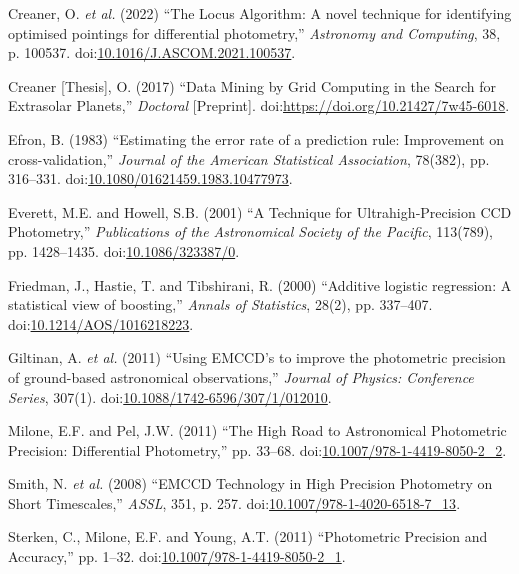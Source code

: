\documentclass[a4paper,fleqn,usenatbib]{mnras}
\newlength{\cslhangindent}
\newlength{\cslentryspacingunit} %
\newenvironment{CSLReferences}[2] %
 {%
  \setlength{\parindent}{0pt}
  \ifodd #1
  \let\oldpar\par
  \def\par{\hangindent=\cslhangindent\oldpar}
  \fi
  \setlength{\parskip}{#2\cslentryspacingunit}
 }%
 {}
\begin{document}
\begin{CSLReferences}{0}{0}
\leavevmode{}%
Creaner, O. \emph{et al.} (2022) {``{The Locus Algorithm: A novel
technique for identifying optimised pointings for differential
photometry},''} \emph{Astronomy and Computing}, 38, p. 100537.
doi:\href{https://doi.org/10.1016/J.ASCOM.2021.100537}{10.1016/J.ASCOM.2021.100537}.

\leavevmode{}%
Creaner {[}Thesis{]}, O. (2017) {``{Data Mining by Grid Computing in the
Search for Extrasolar Planets},''} \emph{Doctoral} {[}Preprint{]}.
doi:\url{https://doi.org/10.21427/7w45-6018}.

\leavevmode{}%
Efron, B. (1983) {``{Estimating the error rate of a prediction rule:
Improvement on cross-validation},''} \emph{Journal of the American
Statistical Association}, 78(382), pp. 316--331.
doi:\href{https://doi.org/10.1080/01621459.1983.10477973}{10.1080/01621459.1983.10477973}.

\leavevmode{}%
Everett, M.E. and Howell, S.B. (2001) {``{A Technique for
Ultrahigh‐Precision CCD Photometry},''} \emph{Publications of the
Astronomical Society of the Pacific}, 113(789), pp. 1428--1435.
doi:\href{https://doi.org/10.1086/323387/0}{10.1086/323387/0}.

\leavevmode{}%
Friedman, J., Hastie, T. and Tibshirani, R. (2000) {``{Additive logistic
regression: A statistical view of boosting},''} \emph{Annals of
Statistics}, 28(2), pp. 337--407.
doi:\href{https://doi.org/10.1214/AOS/1016218223}{10.1214/AOS/1016218223}.

\leavevmode{}%
Giltinan, A. \emph{et al.} (2011) {``{Using EMCCD's to improve the
photometric precision of ground-based astronomical observations},''}
\emph{Journal of Physics: Conference Series}, 307(1).
doi:\href{https://doi.org/10.1088/1742-6596/307/1/012010}{10.1088/1742-6596/307/1/012010}.

\leavevmode{}%
Milone, E.F. and Pel, J.W. (2011) {``{The High Road to Astronomical
Photometric Precision: Differential Photometry},''} pp. 33--68.
doi:\href{https://doi.org/10.1007/978-1-4419-8050-2_2}{10.1007/978-1-4419-8050-2\_2}.

\leavevmode{}%
Smith, N. \emph{et al.} (2008) {``{EMCCD Technology in High Precision
Photometry on Short Timescales},''} \emph{ASSL}, 351, p. 257.
doi:\href{https://doi.org/10.1007/978-1-4020-6518-7_13}{10.1007/978-1-4020-6518-7\_13}.

\leavevmode{}%
Sterken, C., Milone, E.F. and Young, A.T. (2011) {``{Photometric
Precision and Accuracy},''} pp. 1--32.
doi:\href{https://doi.org/10.1007/978-1-4419-8050-2_1}{10.1007/978-1-4419-8050-2\_1}.

\end{CSLReferences}
\end{document}
